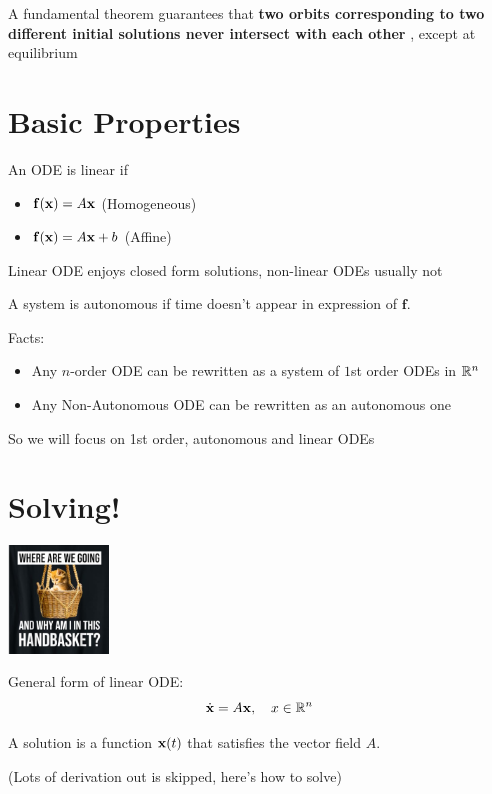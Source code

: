 \documentclass{report}
\begin{document}
A fundamental theorem guarantees 
that \textbf{two orbits corresponding to two different initial solutions never intersect with
each other }, except at equilibrium

\section*{Basic Properties}

An ODE is linear if 
\begin{itemize}
    \item $\mathbf{f}(\mathbf{x}) = A\mathbf{x}$ (Homogeneous)
    \item $\mathbf{f}(\mathbf{x}) = A\mathbf{x} + b$ (Affine)
\end{itemize}

Linear ODE enjoys closed form solutions, non-linear ODEs usually not


A system is autonomous if time doesn't appear in expression of $\mathbf{f}$.

Facts:
\begin{itemize}
    \item Any $n$-order ODE can be rewritten as a system of $1$st order ODEs in $\mathbb{R}^n$
    \item Any Non-Autonomous ODE can be rewritten as an autonomous one
\end{itemize}

So we will focus on 1st order, autonomous and linear ODEs

\section*{Solving!}
    \begin{center}
    \includegraphics[width=0.2\textwidth]{images/cat.png}
\end{center}

General form of linear ODE:
\[
\dot{\mathbf{x}} = A \mathbf{x}, \quad x \in \mathbb{R}^n
\]

A solution is a function $\mathbf{x}(t)$ that satisfies the vector field $A$.

(Lots of derivation out is skipped, here's how to solve)
\end{document}
